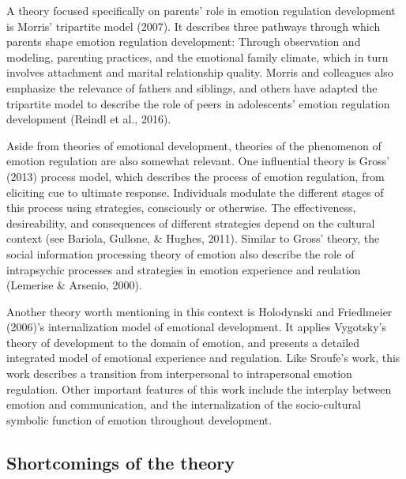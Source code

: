 \documentclass[
  english,
  man]{apa6}
\begin{document}
A theory focused specifically on parents' role in emotion regulation
development is Morris' tripartite model (2007). It
describes three pathways through which parents shape emotion regulation
development: Through observation and modeling, parenting practices, and the
emotional family climate, which in turn involves attachment and marital
relationship quality. Morris and colleagues also emphasize the relevance of
fathers and siblings, and others have adapted the tripartite model to describe
the role of peers in adolescents' emotion regulation development
(Reindl et al., 2016).

Aside from theories of emotional development, theories of the phenomenon of
emotion regulation are also somewhat relevant. One influential theory is Gross'
(2013) process model, which describes the
process of emotion regulation, from eliciting cue to ultimate response.
Individuals modulate the different stages of this process using strategies,
consciously or otherwise. The effectiveness, desireability, and consequences of
different strategies depend on the cultural context (see Bariola, Gullone, \& Hughes, 2011). Similar to Gross' theory, the social
information processing theory of emotion also describe the role of intrapsychic
processes and strategies in emotion experience and reulation
(Lemerise \& Arsenio, 2000).

Another theory worth mentioning in this context is
Holodynski and Friedlmeier (2006)'s internalization model of emotional
development. It applies Vygotsky's theory of development to the domain of
emotion, and presents a detailed integrated model of emotional experience and
regulation. Like Sroufe's work, this work describes a transition from
interpersonal to intrapersonal emotion regulation. Other important features of
this work include the interplay between emotion and communication, and the
internalization of the socio-cultural symbolic function of emotion throughout
development.

\hypertarget{shortcomings-of-the-theory}{%
\subsection{Shortcomings of the theory}\label{shortcomings-of-the-theory}}
\end{document}
